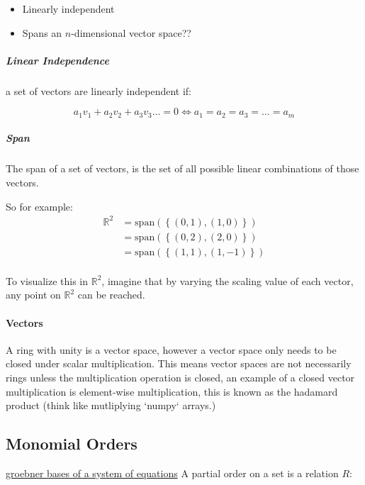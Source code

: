 \documentclass[a4paper,11pt,twoside]{article}
\begin{document}
\begin{itemize}
\item Linearly independent
\item Spans an \(n\)-dimensional vector space??
\end{itemize}
\subparagraph{Linear Independence}
\label{sec:org019c1fb}
a set of vectors are linearly independent if:

\[
      a_{1}v_{1}+a_{2}v_{2}+a_{3}v_{3}\ldots=0 \iff a_{1}=a_{2}=a_{3}=\ldots=a_{m}
      \]
\subparagraph{Span}
\label{sec:orgad5f4b8}
The span of a set of vectors, is the set of all possible linear
combinations of those vectors.

So for example:
\begin{align}
\mathbb{R}^2&=\mathrm{span}\left( \left\{\left(0,1\right), \left(1, 0\right)\right\}  \right)\\
	    &=\mathrm{span}\left( \left\{\left(0,2\right), \left(2, 0\right)\right\}  \right)\\
	    &=\mathrm{span}\left( \left\{\left(1,1\right), \left(1, -1\right)\right\}  \right)\\
\end{align}

To visualize this in \(\mathbb{R}^2\), imagine that by varying
the scaling value of each vector, any point on \(\mathbb{R}^2\)
can be reached.

\paragraph{Vectors}
\label{sec:org2e49b8c}
A ring with unity is a vector space, however a vector space only
needs to be closed under scalar multiplication. This means
vector spaces are not necessarily rings unless the
multiplication operation is closed, an example of a closed
vector multiplication is element-wise multiplication, this is
known as the hadamard product (think like mutliplying `numpy` arrays.)
\subsection{Monomial Orders}
\label{sec:org0aedcdf}
    \href{20210406222024-groebner\_bases\_of\_a\_system\_of\_equations.org}{groebner bases of a system of equations}
A partial order on a set is a relation \(R\):
\end{document}
